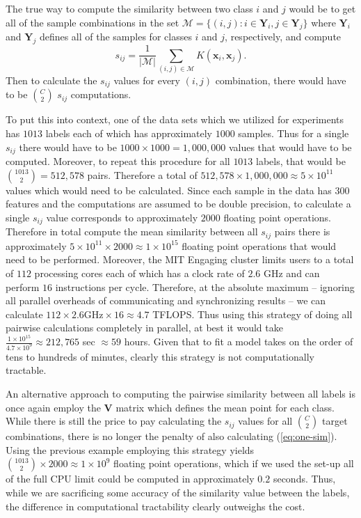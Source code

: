 \documentclass[../thesis.tex]{subfiles}
\begin{document}
The true way to compute the similarity between two class $i$ and $j$ would be to
get all of the sample combinations in the set $\mathcal{M} = \{(i, j): i \in
\mathbf{Y}_i, j \in \mathbf{Y}_j\}$ where $\mathbf{Y}_i$ and $\mathbf{Y}_j$
defines all of the samples for classes $i$ and $j$, respectively, and compute
\begin{equation}
    \label{eq:one-sim}
    s_{ij} = \frac{1}{|\mathcal{M}|} \sum_{(i, j) \in \mathcal{M}}
    K(\mathbf{x}_i, \mathbf{x}_j).
\end{equation}
Then to calculate the $s_{ij}$ values for every $(i, j)$ combination, there
would have to be $\binom{C}{2}$ $s_{ij}$ computations.

To put this into context, one of the data sets which we utilized for experiments
has $1013$ labels each of which has approximately $1000$ samples. Thus for a
single $s_{ij}$ there would have to be $1000 \times 1000 = 1,000,000$ values
that would have to be computed. Moreover, to repeat this procedure for all
$1013$ labels, that would be $\binom{1013}{2} = 512,578$ pairs. Therefore a
total of $512,578 \times 1,000,000 \approx 5 \times 10^{11}$ values which would
need to be calculated. Since each sample in the data has $300$ features and the
computations are assumed to be double precision, to calculate a single $s_{ij}$
value corresponds to approximately $2000$ floating point operations. Therefore
in total compute the mean similarity between all $s_{ij}$ pairs there is
approximately $5 \times 10^{11} \times 2000 \approx 1 \times 10^{15}$ floating
point operations that would need to be performed. Moreover, the MIT Engaging
cluster limits users to a total of $112$ processing cores each of which has a
clock rate of $2.6$ GHz and can perform $16$ instructions per cycle. Therefore,
at the absolute maximum -- ignoring all parallel overheads of communicating and
synchronizing results -- we can calculate $112 \times 2.6 \text{GHz} \times 16
\approx 4.7$ TFLOPS. Thus using this strategy of doing all pairwise calculations
completely in parallel, at best it would take $\frac{1 \times 10^{15}}{4.7
\times 10^9} \approx 212,765$ sec $\approx 59$ hours. Given that to fit a model
takes on the order of tens to hundreds of minutes, clearly this strategy is not
computationally tractable.

An alternative approach to computing the pairwise similarity between all labels
is once again employ the $\mathbf{V}$ matrix which defines the mean point for
each class. While there is still the price to pay calculating the $s_{ij}$
values for all $\binom{C}{2}$ target combinations, there is no longer the
penalty of also calculating (\ref{eq:one-sim}). Using the previous example
employing this strategy yields $\binom{1013}{2} \times 2000 \approx 1 \times
10^9$ floating point operations, which if we used the set-up all of the full CPU
limit could be computed in approximately $0.2$ seconds. Thus, while we are
sacrificing some accuracy of the similarity value between the labels, the
difference in computational tractability clearly outweighs the cost.
\end{document}
